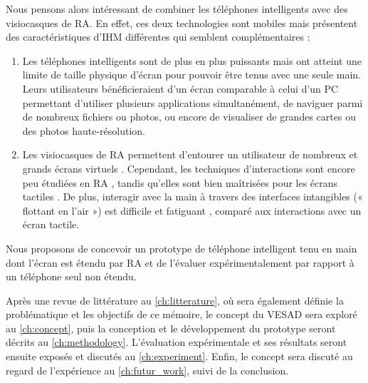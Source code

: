 
Nous pensons alors intéressant de combiner les téléphones intelligents avec des visiocasques de RA. En effet, ces deux technologies sont mobiles mais présentent des caractéristiques d'IHM différentes qui semblent complémentaires :
\begin{enumerate}
  \item Les téléphones intelligents sont de plus en plus puissants mais ont atteint une limite de taille physique d'écran pour pouvoir être tenus avec une seule main. Leurs utilisateurs bénéficieraient d'un écran comparable à celui d'un PC permettant d'utiliser plusieurs applications simultanément, de naviguer parmi de nombreux fichiers ou photos, ou encore de visualiser de grandes cartes ou des photos haute-résolution.
  \item Les visiocasques de RA permettent d'entourer un utilisateur de nombreux et grands écrans virtuels \citep{Ens2014}. Cependant, 
  les techniques d'interactions sont encore peu étudiées en RA \citep{Piumsomboon2013}, tandis qu'elles sont bien maîtrisées pour les écrans tactiles \citep{Wobbrock2009}. De plus, interagir avec la main à travers des interfaces intangibles (« flottant en l'air ») est difficile \citep{Chan2010} et fatiguant \citep{Hincapie-Ramos2014}, comparé aux interactions avec un écran tactile.
\end{enumerate}

Nous proposons de concevoir un prototype de téléphone intelligent tenu en main dont l'écran est étendu par RA et de l'évaluer expérimentalement par rapport à un téléphone seul non étendu.

Après une revue de littérature au \autoref{ch:litterature}, où sera également définie la problématique et les objectifs de ce mémoire, le concept du VESAD sera exploré au \autoref{ch:concept}, puis la conception et le développement du prototype seront décrits au \autoref{ch:methodology}. L'évaluation expérimentale et ses résultats seront ensuite exposés et discutés au \autoref{ch:experiment}. Enfin, le concept sera discuté au regard de l'expérience au \autoref{ch:futur_work}, suivi de la conclusion.